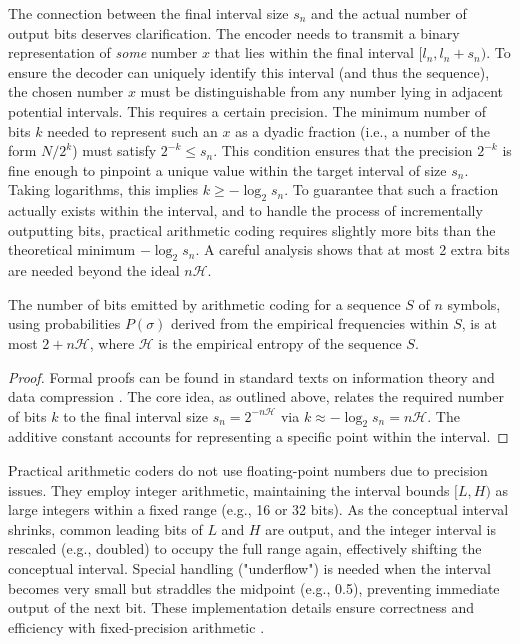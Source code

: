 The connection between the final interval size $s_n$ and the actual number of output bits deserves clarification. The encoder needs to transmit a binary representation of \emph{some} number $x$ that lies within the final interval $[l_n, l_n + s_n)$. To ensure the decoder can uniquely identify this interval (and thus the sequence), the chosen number $x$ must be distinguishable from any number lying in adjacent potential intervals. This requires a certain precision. The minimum number of bits $k$ needed to represent such an $x$ as a dyadic fraction (i.e., a number of the form $N/2^k$) must satisfy $2^{-k} \le s_n$. This condition ensures that the precision $2^{-k}$ is fine enough to pinpoint a unique value within the target interval of size $s_n$. Taking logarithms, this implies $k \ge -\log_2 s_n$. To guarantee that such a fraction actually exists within the interval, and to handle the process of incrementally outputting bits, practical arithmetic coding requires slightly more bits than the theoretical minimum $-\log_2 s_n$. A careful analysis shows that at most 2 extra bits are needed beyond the ideal $n\mathcal{H}$.

\begin{theorem} \label{thm:arithmetic_bits}
    The number of bits emitted by arithmetic coding for a sequence $S$ of $n$ symbols, using probabilities $P(\sigma)$ derived from the empirical frequencies within $S$, is at most $2 + n\mathcal{H}$, where $\mathcal{H}$ is the empirical entropy of the sequence $S$.
\end{theorem}
\begin{proof}
    Formal proofs can be found in standard texts on information theory and data compression \cite{ferragina2023pearls, sayood2002lossless, han2002mathematics, ElementsofInformationTheory}. The core idea, as outlined above, relates the required number of bits $k$ to the final interval size $s_n = 2^{-n\mathcal{H}}$ via $k \approx -\log_2 s_n = n\mathcal{H}$. The additive constant accounts for representing a specific point within the interval.
\end{proof}

\begin{remark}
    Practical arithmetic coders do not use floating-point numbers due to precision issues. They employ integer arithmetic, maintaining the interval bounds $[L, H)$ as large integers within a fixed range (e.g., 16 or 32 bits). As the conceptual interval shrinks, common leading bits of $L$ and $H$ are output, and the integer interval is rescaled (e.g., doubled) to occupy the full range again, effectively shifting the conceptual interval. Special handling ("underflow") is needed when the interval becomes very small but straddles the midpoint (e.g., 0.5), preventing immediate output of the next bit. These implementation details ensure correctness and efficiency with fixed-precision arithmetic \cite{moffat1998arithmetic}.
\end{remark}
